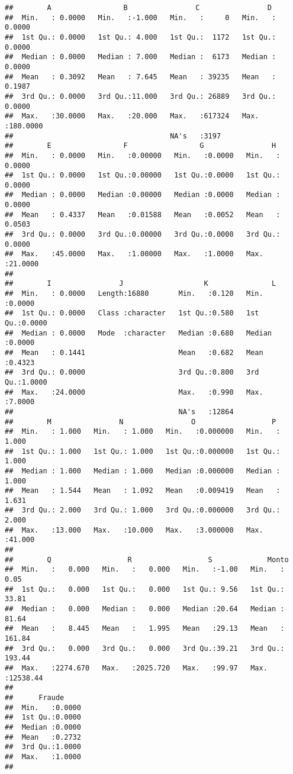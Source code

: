 \documentclass[]{article}
\begin{document}
\begin{verbatim}
##        A                 B                C                D           
##  Min.   : 0.0000   Min.   :-1.000   Min.   :     0   Min.   :  0.0000  
##  1st Qu.: 0.0000   1st Qu.: 4.000   1st Qu.:  1172   1st Qu.:  0.0000  
##  Median : 0.0000   Median : 7.000   Median :  6173   Median :  0.0000  
##  Mean   : 0.3092   Mean   : 7.645   Mean   : 39235   Mean   :  0.1987  
##  3rd Qu.: 0.0000   3rd Qu.:11.000   3rd Qu.: 26889   3rd Qu.:  0.0000  
##  Max.   :30.0000   Max.   :20.000   Max.   :617324   Max.   :180.0000  
##                                     NA's   :3197                       
##        E                 F                 G                H          
##  Min.   : 0.0000   Min.   :0.00000   Min.   :0.0000   Min.   : 0.0000  
##  1st Qu.: 0.0000   1st Qu.:0.00000   1st Qu.:0.0000   1st Qu.: 0.0000  
##  Median : 0.0000   Median :0.00000   Median :0.0000   Median : 0.0000  
##  Mean   : 0.4337   Mean   :0.01588   Mean   :0.0052   Mean   : 0.0503  
##  3rd Qu.: 0.0000   3rd Qu.:0.00000   3rd Qu.:0.0000   3rd Qu.: 0.0000  
##  Max.   :45.0000   Max.   :1.00000   Max.   :1.0000   Max.   :21.0000  
##                                                                        
##        I                J                   K               L         
##  Min.   : 0.0000   Length:16880       Min.   :0.120   Min.   :0.0000  
##  1st Qu.: 0.0000   Class :character   1st Qu.:0.580   1st Qu.:0.0000  
##  Median : 0.0000   Mode  :character   Median :0.680   Median :0.0000  
##  Mean   : 0.1441                      Mean   :0.682   Mean   :0.4323  
##  3rd Qu.: 0.0000                      3rd Qu.:0.800   3rd Qu.:1.0000  
##  Max.   :24.0000                      Max.   :0.990   Max.   :7.0000  
##                                       NA's   :12864                   
##        M                N                O                  P         
##  Min.   : 1.000   Min.   : 1.000   Min.   :0.000000   Min.   : 1.000  
##  1st Qu.: 1.000   1st Qu.: 1.000   1st Qu.:0.000000   1st Qu.: 1.000  
##  Median : 1.000   Median : 1.000   Median :0.000000   Median : 1.000  
##  Mean   : 1.544   Mean   : 1.092   Mean   :0.009419   Mean   : 1.631  
##  3rd Qu.: 2.000   3rd Qu.: 1.000   3rd Qu.:0.000000   3rd Qu.: 2.000  
##  Max.   :13.000   Max.   :10.000   Max.   :3.000000   Max.   :41.000  
##                                                                       
##        Q                  R                  S             Monto         
##  Min.   :   0.000   Min.   :   0.000   Min.   :-1.00   Min.   :    0.05  
##  1st Qu.:   0.000   1st Qu.:   0.000   1st Qu.: 9.56   1st Qu.:   33.81  
##  Median :   0.000   Median :   0.000   Median :20.64   Median :   81.64  
##  Mean   :   8.445   Mean   :   1.995   Mean   :29.13   Mean   :  161.84  
##  3rd Qu.:   0.000   3rd Qu.:   0.000   3rd Qu.:39.21   3rd Qu.:  193.44  
##  Max.   :2274.670   Max.   :2025.720   Max.   :99.97   Max.   :12538.44  
##                                                                          
##      Fraude      
##  Min.   :0.0000  
##  1st Qu.:0.0000  
##  Median :0.0000  
##  Mean   :0.2732  
##  3rd Qu.:1.0000  
##  Max.   :1.0000  
## 
\end{verbatim}
\end{document}
